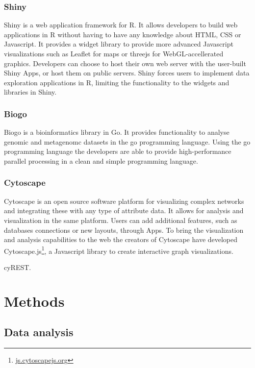 \subsubsection*{Shiny} 
Shiny is a web application framework for R.\cite{shiny} It allows developers to
build web applications in R without having to have any knowledge about HTML, CSS
or Javascript. It provides a widget library to provide more advanced Javascript
visualizations such as Leaflet for maps or threejs for WebGL-accellerated
graphics. Developers can choose to host their own web server with the user-built
Shiny Apps, or host them on public servers. Shiny forces users to implement data
exploration applications in R, limiting the functionality to the 
widgets and libraries in Shiny. 


\subsubsection*{Biogo} 
Biogo is a bioinformatics library in Go. It provides functionality to analyse
genomic and metagenomc datasets in the go programming
language.\cite{Kortschak005033} Using the go programming language the developers
are able to provide high-performance parallel processing in a clean and simple
programming language. 

\subsubsection*{Cytoscape} 
Cytoscape is an open source software platform for visualizing complex
networks and integrating these with any type of attribute
data\cite{shannon2003cytoscape}. It allows for analysis and visualization in the
same platform. Users can add additional features, such as databases connections
or new layouts, through Apps. To bring the visualization and analysis
capabilities to the web the creators of Cytoscape have developed
Cytoscape.js\footnote{\url{js.cytoscapejs.org}}, a Javascript library to create
interactive graph visualizations. 

cyREST. 


\section*{Methods} 
\subsection*{Data analysis} 

